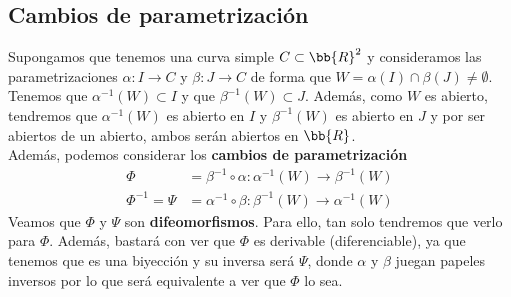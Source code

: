 \subsection{Cambios de parametrización}

\begin{ejemplo}\label{ej:cambio}
    Supongamos que tenemos una curva simple $C\subset \bb{R}^2$ y consideramos las parametrizaciones $\alpha: I \to C$ y $\beta:J \to C$ de forma que $W = \alpha(I)\cap \beta(J)\neq \emptyset$.\\

    Tenemos que $\alpha^{-1}(W)\subset I$ y que $\beta^{-1}(W)\subset J$. Además, como $W$ es abierto, tendremos que $\alpha^{-1}(W)$ es abierto en $I$ y $\beta^{-1}(W)$ es abierto en $J$ y por ser abiertos de un abierto, ambos serán abiertos en $\bb{R}$.\\

    Además, podemos considerar los \textbf{cambios de parametrización}
    \begin{align*}
        \Phi &= \beta^{-1}\circ \alpha : \alpha^{-1}(W) \to \beta^{-1}(W)\\
        \Phi^{-1} = \Psi &= \alpha^{-1}\circ \beta : \beta^{-1}(W) \to \alpha^{-1}(W)
    \end{align*}
    Veamos que $\Phi$ y $\Psi$ son \textbf{difeomorfismos}. Para ello, tan solo tendremos que verlo para $\Phi$. Además, bastará con ver que $\Phi$ es derivable (diferenciable), ya que tenemos que es una biyección y su inversa será $\Psi$, donde $\alpha$ y $\beta$ juegan papeles inversos por lo que será equivalente a ver que $\Phi$ lo sea.\\


\end{ejemplo}
